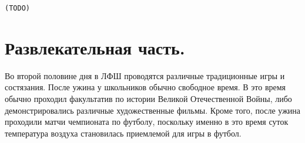 \documentclass[12pt,a4paper,oneside,draft]{scrartcl}
\newcommand{\com}[1]{{\Large{\texttt{{\color{red}(#1)}}}}}
\begin{document}
\com{TODO}

\section{Развлекательная часть.}
\label{sec:fun}

Во второй половине дня в ЛФШ проводятся различные традиционные игры и
состязания. После ужина у школьников обычно свободное время. В это
время обычно проходил факультатив по истории Великой Отечественной
Войны, либо демонстрировались различные художественные фильмы. Кроме
того, после ужина проходили матчи чемпионата по футболу, поскольку
именно в это время суток температура воздуха становилась приемлемой
для игры в футбол.
\end{document}
